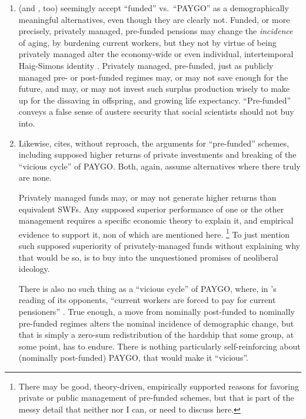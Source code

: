 \begin{enumerate}
	\item \citeauthor{Cerami2009a} (and \citealt{Bastian1998}, too) seemingly accept ``funded'' vs.\ ``PAYGO'' as a demographically meaningful alternatives, even though they are clearly not.
Funded, or more precisely, privately managed, pre-funded pensions may change the \emph{incidence} of aging, by burdening current workers, but they not by virtue of being privately managed alter the economy-wide or even individual, intertemporal Haig-Simons identity \citep[for a detailed model, see][170]{Borsch-Supan2003}.
Privately managed, pre-funded, just as publicly managed pre- or post-funded regimes may, or may not save enough for the future, and may, or may not invest such surplus production wisely to make up for the dissaving in offspring, and growing life expectancy.
``Pre-funded'' conveys a false sense of austere security that social scientists should not buy into.

	\item Likewise, \citeauthor{Cerami2009a} cites, without reproach, the arguments for ``pre-funded'' schemes, including supposed higher returns of private investments and breaking of the ``vicious cycle'' of PAYGO.
	Both, again, assume alternatives where there truly are none.

	Privately managed funds may, or may not generate higher returns than equivalent \glspl{SWF}.
	Any supposed superior performance of one or the other management requires a specific economic theory to explain it, and empirical evidence to support it, non of which are mentioned here.
	\footnote{
		There may be good, theory-driven, empirically supported reasons for favoring private or public management of pre-funded schemes, but that is part of the messy detail that neither \citeauthor{Cerami2009a} nor I can, or need to discuss here.
	}
	To just mention such supposed superiority of privately-managed funds without explaining why that would be so, is to buy into the unquestioned promises of neoliberal ideology.

	There is also no such thing as a ``vicious cycle'' of PAYGO, where, in \citeauthor{Cerami2009a}'s reading of its opponents, ``current workers are forced to pay for current pensioners'' \citeyearpar[339]{Cerami2009a}.
	True enough, a move from nominally post-funded to nominally pre-funded regimes alters the nominal incidence of demographic change, but that is simply a zero-sum redistribution of the hardship that some group, at some point, has to endure.
There is nothing particularly self-reinforcing about (nominally post-funded) PAYGO, that would make it ``vicious''.


\end{enumerate}
